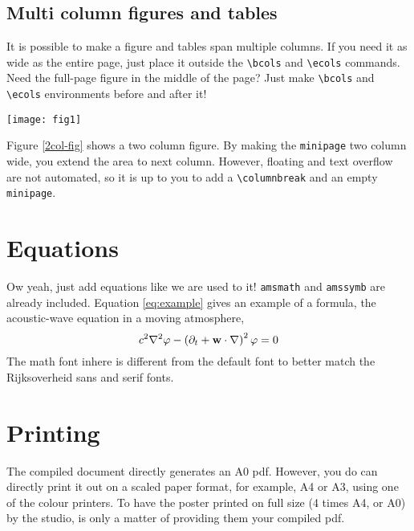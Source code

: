 \documentclass{article}
\begin{document}
\subsection*{Multi column figures and tables}
It is possible to make a figure and tables span multiple columns. If you need it as wide as the entire page, just place it outside the \verb|\bcols| and \verb|\ecols| commands. Need the full-page figure in the middle of the page? Just make \verb|\bcols| and \verb|\ecols| environments before and after it!

\pushdown
\begin{minipage}[b]{\columnwidth}
\end{minipage}

\columnbreak

\vspace{20pt plus 10pt minus 5pt}
\begin{minipage}[b]{\columnwidth}
	\begin{center}
	\texttt{[image: fig1]}
	\label{fig1}
	\end{center}
\end{minipage}
\vspace{-1em}

Figure \ref{2col-fig} shows a two column figure. By making the \verb|minipage| two column wide, you extend the area to next column. However, floating and text overflow are not automated, so it is up to you to add a \verb|\columnbreak| and an empty \verb|minipage|.

\section*{Equations}
Ow yeah, just add equations like we are used to it! \verb|amsmath| and \verb|amssymb| are already included.
Equation \ref{eq:example} gives an example of a formula, the acoustic-wave equation in a moving atmosphere,
\begin{equation}
	c^{2}\nabla^{2} \varphi - \left( \partial_{t} + \bold{w} \cdot \nabla \right)^{2} \varphi = 0
\label{eq:example}
\end{equation}
The math font inhere is different from the default \tex font to better match the Rijksoverheid sans and serif fonts.

\section*{Printing}
The compiled \latex document directly generates an A0 pdf. However, you do can directly print it out on a scaled paper format, for example, A4 or A3, using one of the colour printers.
To have the poster printed on full size (4 times A4, or A0) by the studio, is only a matter of providing them your compiled pdf.
\end{document}
